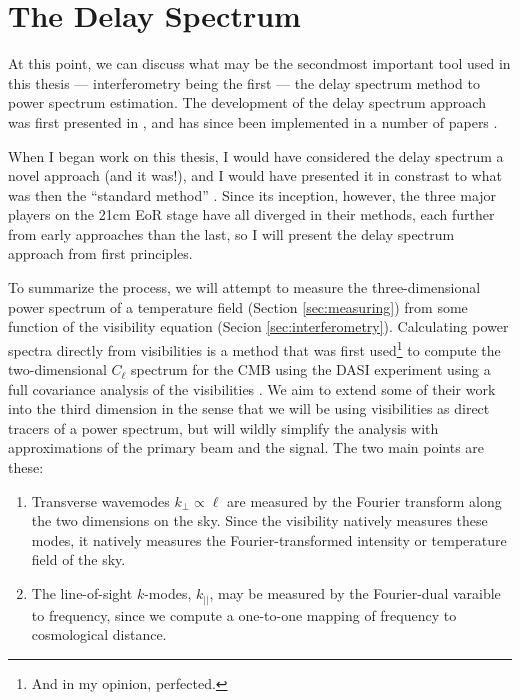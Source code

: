 \section{The Delay Spectrum\label{sec:DelaySpectrum}}

At this point, we can discuss what may be the secondmost important tool used in this thesis ---
interferometry being the first --- the delay spectrum method to power spectrum estimation. The
development of the delay spectrum approach was first presented in \citet{DelaySpectrum}, and has
since been implemented in a number of papers \cite{Parsons2014, Jacobs2014, Moore2014}.

When I began work on this thesis, I would have considered the delay spectrum a novel approach (and
it was!), and I would have presented it in constrast to what was then the ``standard method''
\cite[][e.g.]{FOB, Lidz2008, Bowman2009}. Since its inception, however, the three major players on
the 21cm EoR stage have all diverged in their methods, each further from early approaches than the
last, so I will present the delay spectrum approach from first principles.

To summarize the process, we will attempt to measure the three-dimensional power spectrum of a
temperature field (Section \ref{sec:measuring}) from some function of the visibility equation 
(Secion \ref{sec:interferometry}). Calculating power spectra directly from visibilities is a method
that was first used\footnote{And in my opinion, perfected.} to
compute the two-dimensional $C_\ell$ spectrum for the CMB using the DASI experiment \cite{Kovac2002}
using a full covariance analysis of the visibilities \cite{White1999}. We aim to extend some of
their work into the third dimension in the sense that we will be using visibilities as direct
tracers of a power spectrum, but will wildly simplify the analysis with approximations of the
primary beam and the signal. The two main points are these:
\begin{enumerate}
  \item Transverse wavemodes $k_\perp \propto \ell$ are measured by the Fourier transform along the
    two dimensions on the sky. Since the visibility natively measures these modes, it natively
    measures the Fourier-transformed intensity or temperature field of the sky.
  \item The line-of-sight $k$-modes, $k_{||}$, may be measured by the Fourier-dual varaible to
    frequency, since we compute a one-to-one mapping of frequency to cosmological distance.
\end{enumerate}

